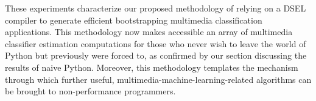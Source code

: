These experiments characterize our proposed methodology of relying on a DSEL compiler to generate efficient bootstrapping multimedia classification applications. This methodology now makes accessible an array of multimedia classifier estimation computations for those who never wish to leave the world of Python but previously were forced to, as confirmed by our section discussing the results of naive Python. Moreover, this methodology templates the mechanism through which further useful, multimedia-machine-learning-related algorithms can be brought to non-performance programmers. 
